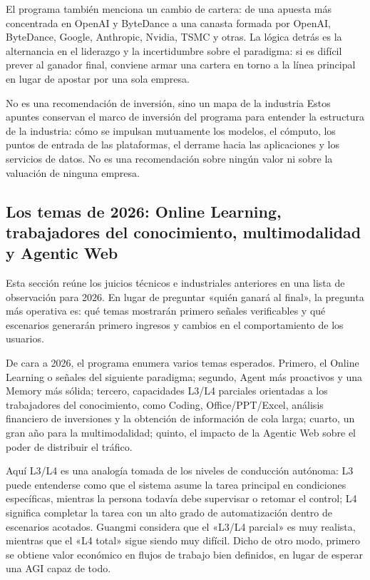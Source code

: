 \documentclass[a4paper]{article}
\begin{document}
El programa también menciona un cambio de cartera: de una apuesta más concentrada en OpenAI y ByteDance a una canasta formada por OpenAI, ByteDance, Google, Anthropic, Nvidia, TSMC y otras. La lógica detrás es la alternancia en el liderazgo y la incertidumbre sobre el paradigma: si es difícil prever al ganador final, conviene armar una cartera en torno a la línea principal en lugar de apostar por una sola empresa.

\begin{knowledgebox}{No es una recomendación de inversión, sino un mapa de la industria}
Estos apuntes conservan el marco de inversión del programa para entender la estructura de la industria: cómo se impulsan mutuamente los modelos, el cómputo, los puntos de entrada de las plataformas, el derrame hacia las aplicaciones y los servicios de datos. No es una recomendación sobre ningún valor ni sobre la valuación de ninguna empresa.
\end{knowledgebox}

\subsection{Los temas de 2026: Online Learning, trabajadores del conocimiento, multimodalidad y Agentic Web}

Esta sección reúne los juicios técnicos e industriales anteriores en una lista de observación para 2026. En lugar de preguntar «quién ganará al final», la pregunta más operativa es: qué temas mostrarán primero señales verificables y qué escenarios generarán primero ingresos y cambios en el comportamiento de los usuarios.

De cara a 2026, el programa enumera varios temas esperados. Primero, el Online Learning o señales del siguiente paradigma; segundo, Agent más proactivos y una Memory más sólida; tercero, capacidades L3/L4 parciales orientadas a los trabajadores del conocimiento, como Coding, Office/PPT/Excel, análisis financiero de inversiones y la obtención de información de cola larga; cuarto, un gran año para la multimodalidad; quinto, el impacto de la Agentic Web sobre el poder de distribuir el tráfico.

Aquí L3/L4 es una analogía tomada de los niveles de conducción autónoma: L3 puede entenderse como que el sistema asume la tarea principal en condiciones específicas, mientras la persona todavía debe supervisar o retomar el control; L4 significa completar la tarea con un alto grado de automatización dentro de escenarios acotados. Guangmi considera que el «L3/L4 parcial» es muy realista, mientras que el «L4 total» sigue siendo muy difícil. Dicho de otro modo, primero se obtiene valor económico en flujos de trabajo bien definidos, en lugar de esperar una AGI capaz de todo.
\end{document}
